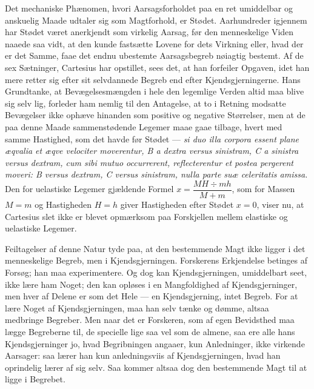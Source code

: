 \documentclass[12pt,a4paper]{book}
\begin{document}
Det mechaniske Phænomen, hvori Aarsagsforholdet paa
en ret umiddelbar og anskuelig Maade udtaler sig som Magtforhold, er
Stødet. Aarhundreder igjennem har Stødet været anerkjendt som virkelig
Aarsag, før den menneskelige Viden naaede saa vidt, at den kunde
fastsætte Lovene for dets Virkning eller, hvad der er det Samme, faae
det endnu ubestemte Aarsagsbegreb nøiagtig bestemt. Af de sex
Sætninger, Cartesius har opstillet, sees det, at han forfeiler Opgaven,
idet han mere retter sig efter sit selvdannede Begreb end efter
Kjendsgjerningerne. Hans Grundtanke, at Bevægelsesmængden i hele den
legemlige Verden altid maa blive sig selv lig, forleder ham nemlig til
den Antagelse, at to i Retning modsatte Bevægelser ikke ophæve hinanden
som positive og negative Størrelser, men at de paa denne Maade
sammenstødende Legemer maae gaae tilbage, hvert med samme Hastighed, som
det havde før Stødet --- \textit{si duo illa corpora essent plane
æqvalia et æqve velociter moverentur, B a dextra versus sinistram,
C a sinistra versus dextram,
cum sibi mutuo occurrerent, reflecterentur et postea pergerent moveri:
B versus dextram, C versus sinistram, nulla parte suæ celeritatis
amissa.} Den for uelastiske Legemer gjældende Formel
$x = \dfrac{MH \div mh}{M + m}$, som for Massen $M = m$ og Hastigheden
$H = h$ giver Hastigheden efter Stødet $x = 0$, viser nu, at Cartesius
slet ikke er blevet opmærksom paa Forskjellen mellem elastiske og
uelastiske Legemer.

Feiltagelser af denne Natur tyde paa, at den bestemmende Magt ikke
ligger i det menneskelige Begreb, men i Kjendsgjerningen. Forskerens
Erkjendelse betinges af Forsøg; han maa experimentere. Og dog kan
Kjendsgjerningen, umiddelbart seet, ikke lære ham Noget; den kan opløses
i en Mangfoldighed af Kjendsgjerninger, men hver af Delene er som det
Hele --- en Kjendsgjerning, intet Begreb. For at lære Noget af
Kjendsgjerningen, maa han selv tænke og dømme, altsaa medbringe
Begreber. Men naar det er
Forskeren, som af egen Bevidsthed maa lægge Begreberne til, de specielle
lige saa vel som de almene, saa ere alle hans Kjendsgjerninger jo, hvad
Begribningen angaaer, kun Anledninger, ikke virkende Aarsager: saa lærer
han kun anledningsviis af Kjendsgjerningen, hvad han oprindelig lærer af
sig selv. Saa kommer altsaa dog den bestemmende Magt til at ligge i
Begrebet.
\end{document}
